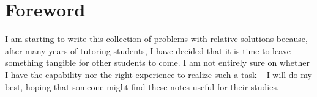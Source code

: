 \chapter*{Foreword}
\label{ch: foreword}
I am starting to write this collection of problems with relative solutions because, after many years of tutoring students, I have decided that it is time to leave something tangible for other students to come. I am not entirely sure on whether I have the capability nor the right experience to realize such a task -- I will do my best, hoping that someone might find these notes useful for their studies.